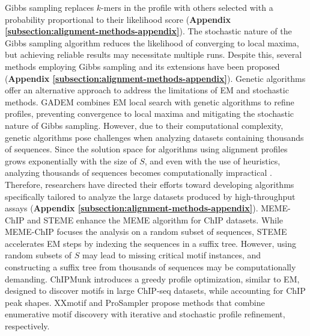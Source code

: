 \documentclass[a4paper, titlepage, openright]{book}
\begin{document}
Gibbs sampling replaces $k$-mers in the profile with others selected with a probability proportional to their likelihood score (\textbf{Appendix \ref{subsection:alignment-methods-appendix}}). The stochastic nature of the Gibbs sampling algorithm reduces the likelihood of converging to local maxima, but achieving reliable results may necessitate multiple runs. Despite this, several methods employing Gibbs sampling and its extensions have been proposed \citep{neuwald1995gibbs,hughes2000computational,workman1999ann,liu2000bioprospector,thijs2001higher,frith2004finding,frith2008discovering} (\textbf{Appendix \ref{subsection:alignment-methods-appendix}}). Genetic algorithms offer an alternative approach to address the limitations of EM and stochastic methods. GADEM \citep{li2009gadem} combines EM local search with genetic algorithms to refine profiles, preventing convergence to local maxima and mitigating the stochastic nature of Gibbs sampling. However, due to their computational complexity, genetic algorithms pose challenges when analyzing datasets containing thousands of sequences. Since the solution space for algorithms using alignment profiles grows exponentially with the size of $S$, and even with the use of heuristics, analyzing thousands of sequences becomes computationally impractical \citep{zambelli2013motif}. Therefore, researchers have directed their efforts toward developing algorithms specifically tailored to analyze the large datasets produced by high-throughput assays (\textbf{Appendix \ref{subsection:alignment-methods-appendix}}). MEME-ChIP \citep{machanick2011meme} and STEME \citep{reid2011steme} enhance the MEME algorithm for ChIP datasets. While MEME-ChIP focuses the analysis on a random subset of sequences, STEME accelerates EM steps by indexing the sequences in a suffix tree. However, using random subsets of $S$ may lead to missing critical motif instances, and constructing a suffix tree from thousands of sequences may be computationally demanding. ChIPMunk \citep{kulakovskiy2010deep} introduces a greedy profile optimization, similar to EM, designed to discover motifs in large ChIP-seq datasets, while accounting for ChIP peak shapes. XXmotif \citep{hartmann2013p} and ProSampler \citep{li2019prosampler} propose methods that combine enumerative motif discovery with iterative and stochastic profile refinement, respectively.

\end{document}
